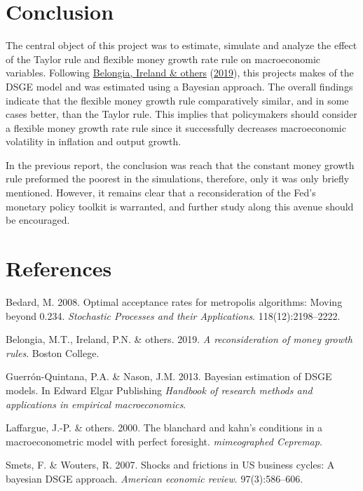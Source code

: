 \documentclass[11pt,preprint, authoryear]{elsarticle}
\numberwithin{equation}{section}
\numberwithin{figure}{section}
\numberwithin{table}{section}
\newlength{\cslhangindent}
\newenvironment{CSLReferences}%
  {\setlength{\parindent}{0pt}%
  \everypar{\setlength{\hangindent}{\cslhangindent}}\ignorespaces}%
  {\par}
\begin{document}
\hypertarget{conclusion}{%
\section{Conclusion}\label{conclusion}}

The central object of this project was to estimate, simulate and analyze
the effect of the Taylor rule and flexible money growth rate rule on
macroeconomic variables. Following
\protect\hyperlink{ref-belongia2019reconsideration}{Belongia, Ireland \&
others} (\protect\hyperlink{ref-belongia2019reconsideration}{2019}),
this projects makes of the DSGE model and was estimated using a Bayesian
approach. The overall findings indicate that the flexible money growth
rule comparatively similar, and in some cases better, than the Taylor
rule. This implies that policymakers should consider a flexible money
growth rate rule since it successfully decreases macroeconomic
volatility in inflation and output growth.

In the previous report, the conclusion was reach that the constant money
growth rule preformed the poorest in the simulations, therefore, only it
was only briefly mentioned. However, it remains clear that a
reconsideration of the Fed's monetary policy toolkit is warranted, and
further study along this avenue should be encouraged.

\newpage

\hypertarget{references}{%
\section*{References}\label{references}}

\hypertarget{refs}{}
\begin{CSLReferences}{1}{0}
\leavevmode\hypertarget{ref-bedard2008optimal}{}%
Bedard, M. 2008. Optimal acceptance rates for metropolis algorithms:
Moving beyond 0.234. \emph{Stochastic Processes and their Applications}.
118(12):2198--2222.

\leavevmode\hypertarget{ref-belongia2019reconsideration}{}%
Belongia, M.T., Ireland, P.N. \& others. 2019. \emph{A reconsideration
of money growth rules}. Boston College.

\leavevmode\hypertarget{ref-guerron2013bayesian}{}%
Guerrón-Quintana, P.A. \& Nason, J.M. 2013. Bayesian estimation of DSGE
models. In Edward Elgar Publishing \emph{Handbook of research methods
and applications in empirical macroeconomics}.

\leavevmode\hypertarget{ref-laffargue2000blanchard}{}%
Laffargue, J.-P. \& others. 2000. The blanchard and kahn's conditions in
a macroeconometric model with perfect foresight. \emph{mimeographed
Cepremap}.

\leavevmode\hypertarget{ref-smets}{}%
Smets, F. \& Wouters, R. 2007. Shocks and frictions in US business
cycles: A bayesian DSGE approach. \emph{American economic review}.
97(3):586--606.

\end{CSLReferences}
\end{document}
